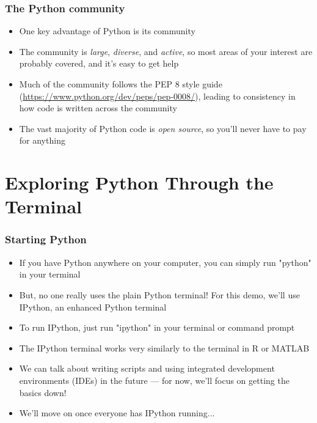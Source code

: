 \documentclass{beamer}\usepackage[]{graphicx}\usepackage[]{color}
\begin{document}
\begin{frame}
\frametitle{The Python community}

\begin{itemize}
	\item One key advantage of Python is its community

	\item The community is \emph{large}, \emph{diverse}, and \emph{active}, so most areas of your interest are probably covered, and it's easy to get help

	\item Much of the community follows the PEP 8 style guide (\url{https://www.python.org/dev/peps/pep-0008/}), leading to consistency in how code is written across the community

	\item The vast majority of Python code is \emph{open source}, so you'll never have to pay for anything
\end{itemize}
\end{frame}

\section{Exploring Python Through the Terminal}

\begin{frame}
\frametitle{Starting Python}

\begin{itemize}
	\item If you have Python anywhere on your computer, you can simply run "python" in your terminal

	\item But, no one really uses the plain Python terminal! For this demo, we'll use IPython, an enhanced Python terminal

	\item To run IPython, just run "ipython" in your terminal or command prompt

	\item The IPython terminal works very similarly to the terminal in R or MATLAB
	
	\item We can talk about writing scripts and using integrated development environments (IDEs) in the future --- for now, we'll focus on getting the basics down!

	\item We'll move on once everyone has IPython running...
\end{itemize}
\end{frame}
\end{document}
